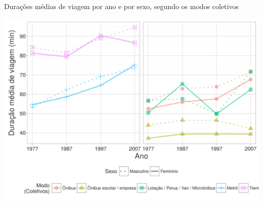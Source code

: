 \begin{grafico}[htb]%
    \caption{\label{graf:duracao-coletivo}Durações médias de viagem por ano e por sexo, segundo os modos coletivos}%
    \begin{center}%
        \includegraphics[width=1\textwidth]{./imagens/duracao-coletivo.png}%
    \end{center}%
\end{grafico}%

